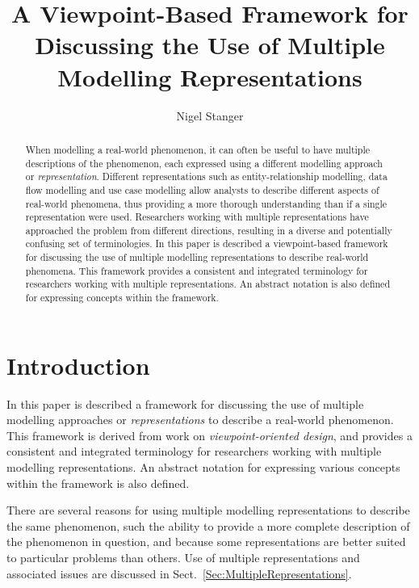\documentclass[10pt]{llncs}
\title{A Viewpoint-Based Framework for Discussing the Use of Multiple Modelling Representations}
\author{Nigel Stanger}
\institute{University of Otago, Department of Information Science, \\ PO Box 56, Dunedin, New Zealand \\ \email{nstanger@infoscience.otago.ac.nz}}
\begin{document}
\pagestyle{empty}

\maketitle

\begin{abstract}
When modelling a real-world phenomenon, it can often be useful to have multiple descriptions of the phenomenon, each expressed using a different modelling approach or \emph{representation}. Different representations such as entity-relationship modelling, data flow modelling and use case modelling allow analysts to describe different aspects of real-world phenomena, thus providing a more thorough understanding than if a single representation were used. Researchers working with multiple representations have approached the problem from different directions, resulting in a diverse and potentially confusing set of terminologies. In this paper is described a viewpoint-based framework for discussing the use of multiple modelling representations to describe real-world phenomena. This framework provides a consistent and integrated terminology for researchers working with multiple representations. An abstract notation is also defined for expressing concepts within the framework.
\end{abstract}


\section{Introduction}
\label{Sec:Introduction}

In this paper is described a framework for discussing the use of multiple modelling approaches or \emph{representations} to describe a real-world phenomenon. This framework is derived from work on \emph{viewpoint-oriented design}, and provides a consistent and integrated terminology for researchers working with multiple modelling representations. An abstract notation for expressing various concepts within the framework is also defined.

There are several reasons for using multiple modelling representations to describe the same phenomenon, such the ability to provide a more complete description of the phenomenon in question, and because some representations are better suited to particular problems than others. Use of multiple representations and associated issues are discussed in Sect.~\ref{Sec:MultipleRepresentations}.
\end{document}
